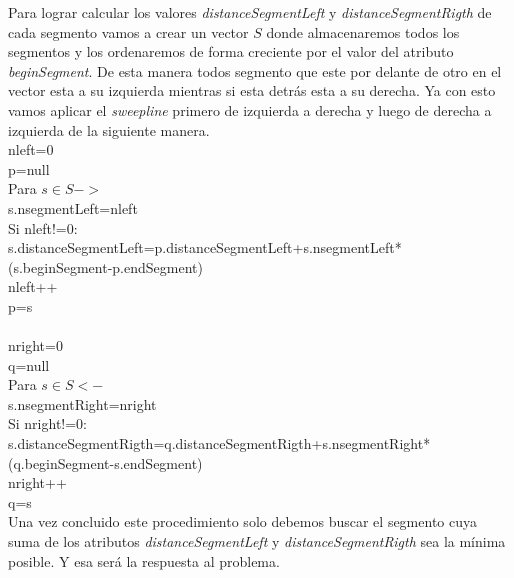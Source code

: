 Para lograr calcular los valores \emph{distanceSegmentLeft} y \emph{distanceSegmentRigth} de cada segmento vamos a crear un vector $S$ donde almacenaremos todos los segmentos y los ordenaremos de forma creciente por el valor del atributo \emph{beginSegment}. De esta manera todos segmento que este por delante de otro en el vector esta a su izquierda mientras si esta detrás esta a su derecha. Ya con esto vamos aplicar el \emph{sweepline} primero de izquierda a derecha y luego de derecha a izquierda de la siguiente manera.\\
nleft=0\\
p=null\\
Para $s \in S ->$\\
\hspace*{0.3in}s.nsegmentLeft=nleft\\
\hspace*{0.3in}Si nleft!=0:\\
\hspace*{0.6in}s.distanceSegmentLeft=p.distanceSegmentLeft+s.nsegmentLeft*\\
\hspace*{0.9in}(s.beginSegment-p.endSegment)\\
\hspace*{0.3in}nleft++\\
\hspace*{0.3in}p=s\\
\\
nright=0\\
q=null\\ 
Para $s \in S <-$\\
\hspace*{0.3in}s.nsegmentRight=nright\\
\hspace*{0.3in}Si nright!=0:\\
\hspace*{0.6in}s.distanceSegmentRigth=q.distanceSegmentRigth+s.nsegmentRight*\\
\hspace*{0.9in}(q.beginSegment-s.endSegment)\\
\hspace*{0.3in}nright++\\
\hspace*{0.3in}q=s\\

Una vez concluido este procedimiento solo debemos buscar el segmento cuya suma de los atributos \emph{distanceSegmentLeft} y \emph{distanceSegmentRigth} sea la mínima posible. Y esa será la respuesta al problema. 